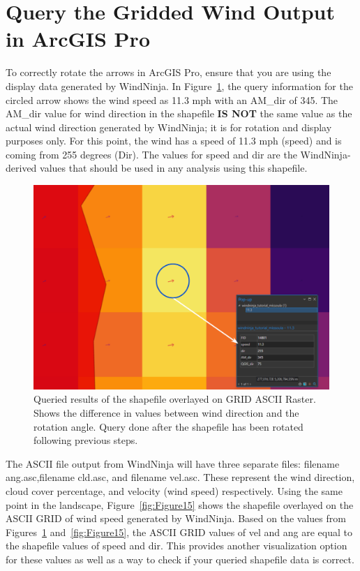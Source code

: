 \documentclass[12pt]{article}
\begin{document}
\section*{Query the Gridded Wind Output in ArcGIS Pro}
To correctly rotate the arrows in ArcGIS Pro, ensure that you are using the display data generated by WindNinja. In Figure~\ref{fig:Figure14}, the query information for the circled arrow shows the wind speed as 11.3 mph with an AM\_dir of 345. The AM\_dir value for wind direction in the shapefile \textbf{IS NOT} the same value as the actual wind direction generated by WindNinja; it is for rotation and display purposes only. For this point, the wind has a speed of 11.3 mph (speed) and is coming from 255 degrees (Dir). The values for speed and dir are the WindNinja-derived values that should be used in any analysis using this shapefile. 

\begin{figure}[H]
	\centering
	\includegraphics[scale=0.4]{arc_14.png}
	\caption{Queried results of the shapefile overlayed on GRID ASCII Raster. Shows the difference in values between wind direction and the rotation angle. Query done after the shapefile has been rotated following previous steps.}
\label{fig:Figure14}
\end{figure}

\newpage

The ASCII file output from WindNinja will have three separate files: filename ang.asc,filename cld.asc, and filename vel.asc. These represent the wind direction, cloud cover percentage, and velocity (wind speed) respectively. Using the same point in the landscape, Figure~\ref{fig:Figure15} shows the shapefile overlayed on the ASCII GRID of wind speed generated by WindNinja. Based on the values from Figures~\ref{fig:Figure14} and~\ref{fig:Figure15}, the ASCII GRID values of vel and ang are equal to the shapefile values of speed and dir. This provides another visualization option for these values as well as a way to check if your queried shapefile data is correct. 
\end{document}
